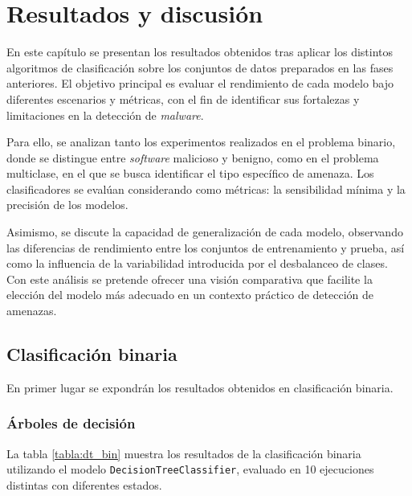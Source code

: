\chapter{Resultados y discusión}
\label{ch:resultados}

En este capítulo se presentan los resultados obtenidos tras aplicar los distintos algoritmos de clasificación sobre los conjuntos de datos preparados en las fases anteriores. El objetivo principal es evaluar el rendimiento de cada modelo bajo diferentes escenarios y métricas, con el fin de identificar sus fortalezas y limitaciones en la detección de \textit{malware}.

\vspace{1em}

Para ello, se analizan tanto los experimentos realizados en el problema binario, donde se distingue entre \textit{software} malicioso y benigno, como en el problema multiclase, en el que se busca identificar el tipo específico de amenaza. Los clasificadores se evalúan considerando como métricas: la sensibilidad mínima y la precisión de los modelos.

\vspace{1em}

Asimismo, se discute la capacidad de generalización de cada modelo, observando las diferencias de rendimiento entre los conjuntos de entrenamiento y prueba, así como la influencia de la variabilidad introducida por el desbalanceo de clases. Con este análisis se pretende ofrecer una visión comparativa que facilite la elección del modelo más adecuado en un contexto práctico de detección de amenazas.

\newpage
\section{Clasificación binaria}
\label{sec:clas_binaria}

En primer lugar se expondrán los resultados obtenidos en clasificación binaria.

\subsection{Árboles de decisión}
\label{subsec:dt_bin}

La tabla \ref{tabla:dt_bin} muestra los resultados de la clasificación binaria utilizando el modelo \texttt{DecisionTreeClassifier}, evaluado en 10 ejecuciones distintas con diferentes estados.

